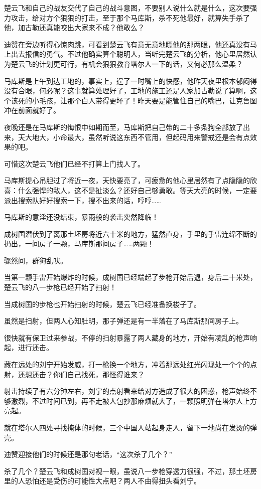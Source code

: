 楚云飞和自己的战友交代了自己的战斗意图，不要别人说什么就是什么，这次要强力攻击，给对方个狠狠的打击，至于那个马库斯，杀不死他最好，就算失手杀了他，加古勒还真能咬出大家来不成？他敢么？

迪赞在旁边听得心惊肉跳，可看到楚云飞有意无意地瞟他的那两眼，他还真没有马上出去报信的勇气。不过他确实算个聪明人，当听完楚云飞的分析，他心里居然认为楚云飞的计划更可行，有机会狠狠教育塔尔人一下的话，又何必那么温柔？

马库斯是上午到达工地的，事实上，逞了一时嘴上的快感，他昨天夜里根本郁闷得没有合眼，何必呢？这事就算处理好了，工地的施工还是人家加古勒说了算啊，这个该死的小毛孩，让那个白人带得更坏了！昨天要是能管住自己的嘴巴，让克鲁图冲在前面就好了。

夜晚还是在马库斯的悔恨中如期而至，马库斯把自己带的二十多条狗全部放了出来，天大地大，小命最大，虽然听说这东西不管用，但起码用来警戒还是会有点效果的吧。

可惜这次楚云飞他们已经不打算上门找人了。

马库斯提心吊胆过了将近一夜，天快要亮了，可疲惫的他心里居然有了点隐隐的欣喜：什么强悍的敌人，这不是扯淡么？还好自己够勇敢。等天大亮的时候，一定要派出搜索队好好搜索一下，搜不出来的话，哼哼……

马库斯的意淫还没结束，暴雨般的袭击突然降临！

成树国潜伏到了离那土坯房将近六十米的地方，猛然直身，手里的手雷连绵不断的扔出，一间房子一颗，马库斯那间房子……两颗！

骤然间，群狗乱吠。

当第一颗手雷开始爆炸的时候，成树国已经端起了步枪开始后退，身后二十米处，楚云飞的八一步枪已经开始了扫射！

当成树国的步枪也开始扫射的时候，楚云飞已经准备换梭子了。

虽然是扫射，但两人心知肚明，那子弹还是有一半落在了马库斯那间房子上。

很快就有保卫过来参战，不停的扫射暴露了两人藏身的地方，开始有凌乱的枪声响起，进行还击。

藏在远处的刘宁开始发威，打一枪换一个地方，冲着那远处红光闪现处一个个的点射，还想还击？你们自己找死，那怪得谁来？

射击持续了有六分钟左右，刘宁的点射看来给对方造成了很大的困惑，枪声始终不够激烈，不过时间已到，再不走被人包抄那麻烦就大了，一颗照明弹在塔尔人上方亮起。

就在塔尔人四处寻找掩体的时候，三个中国人站起身走人，留下一地尚在发烫的弹壳。

迪赞迎接他们的时候还是那句老话，“这次杀了几个？”

杀了几个？楚云飞和成树国对视一眼，虽说八一步枪穿透力很强，不过，那土坯房里的人恐怕还是受伤的可能性大点吧？两人不由得扭头看刘宁。

